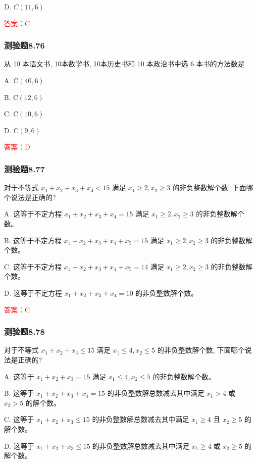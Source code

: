 \documentclass[UTF8, heading=true]{ctexart}
\begin{document}
D. $ C(11,6)$

\textcolor{red}{答案：C}


\subsubsection{测验题8.76}

从 10 本语文书, 10本数学书, 10本历史书和 10 本政治书中选 6 本书的方法数是

A. $\mathrm{C}(40,6)$

B. $\mathrm{C}(12,6)$

C. $\mathrm{C}(10,6)$

D. $\mathrm{C}(9,6)$

\textcolor{red}{答案：D}

\subsubsection{测验题8.77}

对于不等式 $x_1+x_2+x_3+x_4<15$ 满足 $x_1 \geq 2, x_2 \geq 3$ 的非负整数解个数. 下面哪个说法是正确的?

A. 这等于不定方程 $x_1+x_2+x_3+x_4=15$ 满足 $x_1 \geq 2, x_2 \geq 3$ 的非负整数解个数。

B. 这等于不定方程 $x_1+x_2+x_3+x_4+x_5=15$ 满足 $x_1 \geq 2, x_2 \geq 3$ 的非负整数解个数。

C. 这等于不定方程 $x_1+x_2+x_3+x_4+x_5=14$ 满足 $x_1 \geq 2, x_2 \geq 3$ 的非负整数解个数。

D. 这等于不定方程 $x_1+x_2+x_3+x_4=10$ 的非负整数解个数。

\textcolor{red}{答案：C}

\subsubsection{测验题8.78}

对于不等式 $x_1+x_2+x_3 \leq 15$ 满足 $x_1 \leq 4, x_2 \leq 5$ 的非负整数解个数, 下面哪个说法是正确的?

A. 这等于 $x_1+x_2+x_3=15$ 满足 $x_1 \leq 4, x_2 \leq 5$ 的非负整数解个数。

B. 这等于 $x_1+x_2+x_3+x_4=15$ 的非负整数解总数减去其中满足 $x_1>4$ 或 $x_2>5$ 的解个数。

C. 这等于 $x_1+x_2+x_3 \leq 15$ 的非负整数解总数减去其中满足 $x_1 \geq 4$ 且 $x_2 \geq 5$ 的解个数。

D. 这等于 $x_1+x_2+x_3 \leq 15$ 的非负整数解总数减去其中满足 $x_1 \geq 4$ 或 $x_2 \geq 5$ 的解个数。
\end{document}
